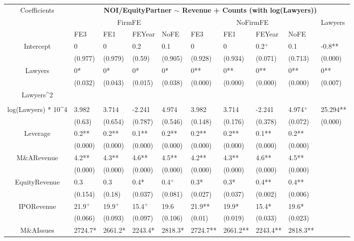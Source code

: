 \documentclass{article}
\begin{document}
\begin{table}[H]
\centering
\begin{tabular}{|clllllllll|}
\hline
\multirow{3}{*}{Coefficients} & \multicolumn{9}{c|}{\textbf{NOI/EquityPartner $\sim$ Revenue + Counts (with log(Lawyers))}} \\
\cline{2-10}
& \multicolumn{4}{c}{FirmFE} & \multicolumn{4}{c}{NoFirmFE} & \multirow{2}{*}{Lawyers} \\
\cline{2-9}
& FE3 & FE1 & FEYear & NoFE & FE3 & FE1 & FEYear & NoFE &  \\
\hline
 
Intercept & 0 & 0 & 0.2 & 0.1 & 0 & 0 & 0.2$^{+}$ & 0.1 & -0.8** \\ 
   & (0.977) & (0.979) & (0.59) & (0.905) & (0.928) & (0.934) & (0.071) & (0.713) & (0.000) \\ 
  Lawyers & 0* & 0* & 0* & 0* & 0** & 0** & 0** & 0** & 0** \\ 
   & (0.032) & (0.043) & (0.015) & (0.038) & (0.000) & (0.000) & (0.000) & (0.000) & (0.007) \\ 
  Lawyers^2 &  &  &  &  &  &  &  &  &  \\ 
   &  &  &  &  &  &  &  &  &  \\ 
  log(Lawyers) * 10^4 & 3.982 & 3.714 & -2.241 & 4.974 & 3.982 & 3.714 & -2.241 & 4.974$^{+}$ & 25.294** \\ 
   & (0.63) & (0.654) & (0.787) & (0.546) & (0.148) & (0.176) & (0.378) & (0.072) & (0.000) \\ 
  Leverage & 0.2** & 0.2** & 0.1** & 0.2** & 0.2** & 0.2** & 0.1** & 0.2** &  \\ 
   & (0.000) & (0.000) & (0.000) & (0.000) & (0.000) & (0.000) & (0.000) & (0.000) &  \\ 
  M\&ARevenue & 4.2** & 4.3** & 4.6** & 4.5** & 4.2** & 4.3** & 4.6** & 4.5** &  \\ 
   & (0.000) & (0.000) & (0.000) & (0.000) & (0.000) & (0.000) & (0.000) & (0.000) &  \\ 
  EquityRevenue & 0.3 & 0.3 & 0.4* & 0.4$^{+}$ & 0.3* & 0.3* & 0.4** & 0.4** &  \\ 
   & (0.154) & (0.18) & (0.037) & (0.081) & (0.027) & (0.037) & (0.002) & (0.006) &  \\ 
  IPORevenue & 21.9$^{+}$ & 19.9$^{+}$ & 15.4$^{+}$ & 19.6 & 21.9** & 19.9* & 15.4* & 19.6* &  \\ 
   & (0.066) & (0.093) & (0.097) & (0.106) & (0.01) & (0.019) & (0.033) & (0.023) &  \\ 
  M\&AIssues & 2724.7* & 2661.2* & 2243.4* & 2818.3* & 2724.7** & 2661.2** & 2243.4** & 2818.3** &  \\ 

\end{tabular}
\end{table}
\end{document}
